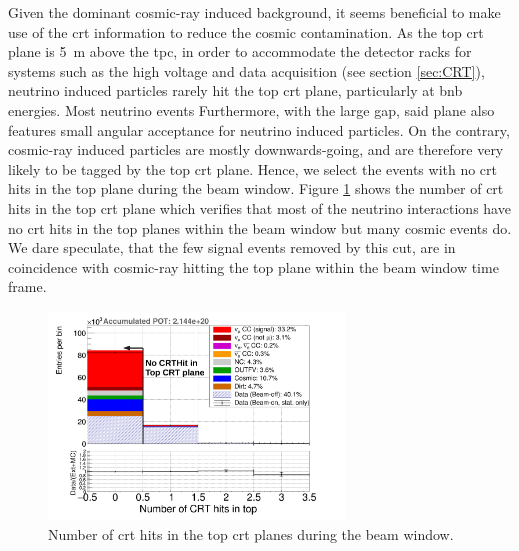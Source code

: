 Given the dominant cosmic-ray induced background, it seems beneficial to make use of the \gls{crt} information to reduce the cosmic contamination. As the top \gls{crt} plane is \SI{5}{\metre} above the \gls{tpc}, in order to accommodate the detector racks for systems such as the high voltage and data acquisition (see section \ref{sec:CRT}), neutrino induced particles rarely hit the top \gls{crt} plane, particularly at \gls{bnb} energies. Most neutrino events Furthermore, with the large gap, said plane also features small angular acceptance for neutrino induced particles. On the contrary, cosmic-ray induced particles are mostly downwards-going, and are therefore very likely to be tagged by the top \gls{crt} plane. Hence, we select the events with no \gls{crt} hits in the top plane during the beam window. Figure \ref{fig:no_top_CRT_cut1} shows the number of \gls{crt} hits in the top \gls{crt} plane which verifies that most of the neutrino interactions have no \gls{crt} hits in the top planes within the beam window but many cosmic events do. We dare speculate, that the few signal events removed by this cut, are in coincidence with cosmic-ray hitting the top plane within the beam window time frame.
\begin{figure}[htbp]
  \centering
  \includegraphics[width=0.7\textwidth]{images/NewCCInclusive/selection/No_CRThit_top_1.pdf}
  \caption[CRT Top Plane Cut]{Number of \gls{crt} hits in the top \gls{crt} planes during the beam window.}
  \label{fig:no_top_CRT_cut1}
\end{figure}

